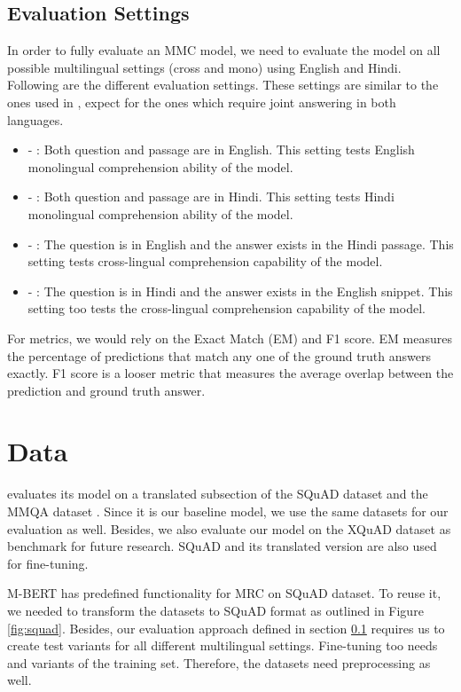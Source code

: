 \documentclass[acmsmall]{acmart}
\begin{document}
\subsection{Evaluation Settings}
\label{eval_settings}
\par In order to fully evaluate an MMC model, we need to evaluate the model on all possible multilingual settings (cross and mono) using English and Hindi. Following are the different evaluation settings. These settings are similar to the ones used in \cite{latestMQA}, expect for the ones which require joint answering in both languages. 
\begin{itemize}
\item  - : Both question and passage are in English. This setting tests English monolingual comprehension ability of the model. 
\item  - : Both question and passage are in Hindi. This setting tests Hindi monolingual comprehension ability of the model. 
\item  - : The question is in English and the answer exists in the Hindi passage. This setting tests cross-lingual comprehension capability of the model.
\item  - : The question is in Hindi and the answer exists in the English snippet. This setting too tests the cross-lingual comprehension capability of the model.
\end{itemize}
\par For metrics, we would rely on the Exact Match (EM) and F1 score. EM measures the percentage of predictions that match any one of the ground truth answers exactly. F1 score is a looser metric that measures the average overlap between the prediction and ground truth answer.




\section{Data}
\label{datasets}
\par \cite{latestMQA} evaluates its model on a translated subsection of the SQuAD dataset and the MMQA dataset \cite{mmqa}. Since it is our baseline model, we use the same datasets for our evaluation as well. Besides, we also evaluate our model on the XQuAD dataset as benchmark for future research. SQuAD and its translated version are also used for fine-tuning. 
\par M-BERT has predefined functionality for MRC on SQuAD dataset. To reuse it, we needed to transform the datasets to SQuAD format as outlined in Figure \ref{fig:squad}. Besides, our evaluation approach defined in section \ref{eval_settings} requires us to create test variants for all different multilingual settings. Fine-tuning too needs  and  variants of the training set. Therefore, the datasets need preprocessing as well.  
\end{document}

